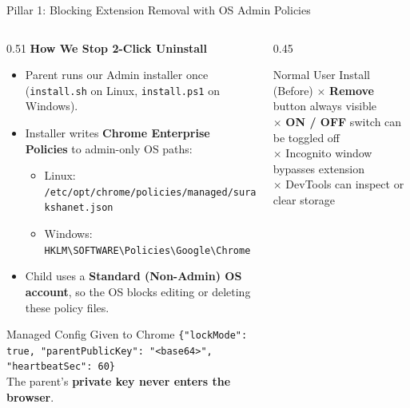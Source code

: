 \documentclass[aspectratio=169,10pt]{beamer}
\begin{document}
\begin{frame}{Pillar 1: Blocking Extension Removal with OS Admin Policies}
  \begin{columns}[T]
    \begin{column}{0.51\textwidth}
      \textbf{\footnotesize\color{snDark}How We Stop 2-Click Uninstall}
      \begin{itemize}\scriptsize
        \setlength\itemsep{5pt}
        \item Parent runs our Admin installer once (\texttt{install.sh} on Linux, \texttt{install.ps1} on Windows).
        \item Installer writes \textbf{Chrome Enterprise Policies} to admin-only OS paths:
          \begin{itemize}\fontsize{6.5}{7.8}\selectfont
            \item Linux: \nolinkurl{/etc/opt/chrome/policies/managed/surakshanet.json}
            \item Windows: \texttt{HKLM\textbackslash SOFTWARE\textbackslash Policies\textbackslash Google\textbackslash Chrome}
          \end{itemize}
        \item Child uses a \textbf{Standard (Non-Admin) OS account}, so the OS blocks editing or deleting these policy files.
      \end{itemize}

      \vspace{0.15cm}
      \begin{softcard}[snBlue!45]{Managed Config Given to Chrome}
        \fontsize{6.8}{8.2}\selectfont
        \texttt{\{"lockMode": true, "parentPublicKey": "<base64>", "heartbeatSec": 60\}}\\[2pt]
        The parent's \textbf{private key never enters the browser}.
      \end{softcard}
    \end{column}
    \begin{column}{0.45\textwidth}
      \begin{softcard}[snRed!55]{Normal User Install (Before)}
        \scriptsize
        $\times$ \textbf{Remove} button always visible\\[2pt]
        $\times$ \textbf{ON / OFF} switch can be toggled off\\[2pt]
        $\times$ Incognito window bypasses extension\\[2pt]
        $\times$ DevTools can inspect or clear storage
      \end{softcard}


\end{column}
\end{columns}
\end{frame}
\end{document}
